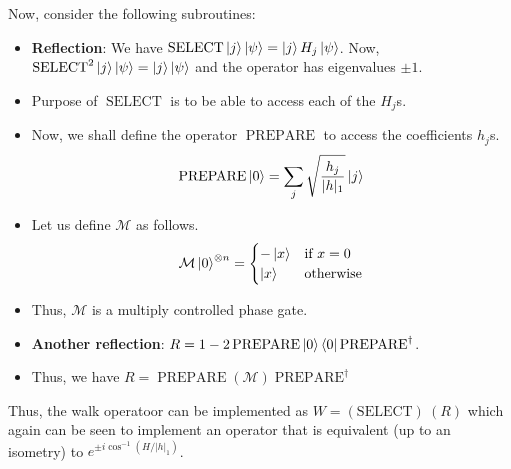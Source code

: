 \documentclass[
10pt, %
a4paper, %
oneside, %
headinclude,footinclude, %
BCOR5mm, %
]{scrartcl}
\begin{document}
Now, consider the following subroutines:
\begin{itemize}
    \item \textbf{Reflection}: We have $\operatorname{SELECT} \ket{j} \ket{\psi} = \ket{j} H_j \ket{\psi}$.
    Now, $\operatorname{SELECT}^2\ket{j} \ket{\psi} = \ket{j} \ket{\psi}$ and the operator has eigenvalues $\pm 1$.
    \item Purpose of $\operatorname{SELECT}$ is to be able to access each of the $H_j$s.
    \item Now, we shall define the operator $\operatorname{PREPARE}$ to access the coefficients $h_j$s. 
    $$ \operatorname{PREPARE}\ket{0} = \sum_j \sqrt{\frac{h_j}{|h|_1}}\ket{j}$$
    \item Let us define $\mathcal{M}$ as follows.
    $$ \mathcal{M}\ket{0}^{\otimes n} = \begin{cases} -\ket{x} & \text{if } x = 0 \\ \ket{x} & \text{otherwise} \end{cases}$$
    \item Thus, $\mathcal{M}$ is a multiply controlled phase gate.
    \item \textbf{Another reflection}: $R = 1 - 2\operatorname{PREPARE} \ket{0}\bra{0} \operatorname{PREPARE}^{\dagger}$.
    \item Thus, we have $R = \operatorname{PREPARE} (\mathcal{M}) \operatorname{PREPARE}^{\dagger}$
\end{itemize}
Thus, the walk operatoor can be implemented as $W = \operatorname{(SELECT)}\ (R)$ which again can be seen to implement an operator that is equivalent (up to an isometry) to $e^{\pm i \cos^{-1}(H/|h|_1)}$.

\nocite{*}


\end{document}
